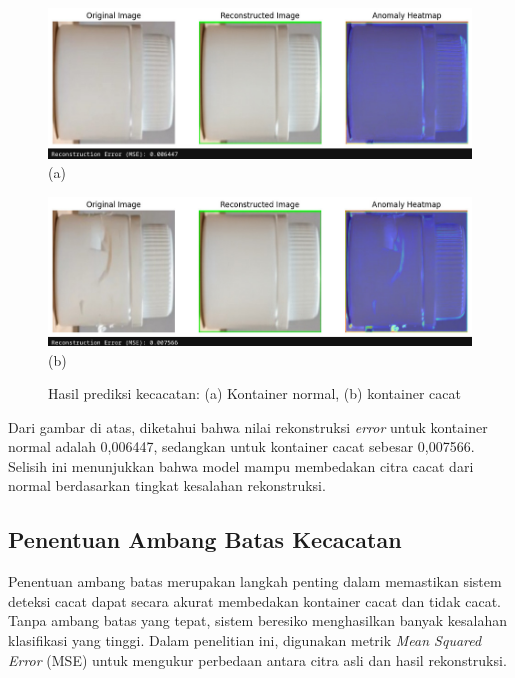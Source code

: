 \begin{figure}[H]
  \centering
  \begin{minipage}{\textwidth}
    \centering
    \includegraphics[width=\textwidth]{gambar/kontainer_bagus.jpeg}
    (a)
  \end{minipage}
  \vspace{1em}

  \begin{minipage}{\textwidth}
    \centering
    \includegraphics[width=\textwidth]{gambar/kontainer_cacat.jpeg}
    (b)
  \end{minipage}
  \caption{Hasil prediksi kecacatan: (a) Kontainer normal, (b)
  kontainer cacat}
  \label{fig:autoencoder-test}
  \vspace{-1em}
\end{figure}

Dari gambar di atas, diketahui bahwa nilai rekonstruksi
\textit{error} untuk kontainer
normal adalah 0,006447, sedangkan untuk kontainer cacat sebesar
0,007566. Selisih ini menunjukkan bahwa model mampu membedakan citra
cacat dari normal berdasarkan tingkat kesalahan rekonstruksi.

\vspace{1em}

\subsection{Penentuan Ambang Batas Kecacatan}
\noindent{}
Penentuan ambang batas merupakan langkah penting dalam memastikan
sistem deteksi cacat dapat secara akurat membedakan kontainer cacat
dan tidak cacat. Tanpa ambang batas yang tepat, sistem beresiko
menghasilkan banyak kesalahan klasifikasi yang tinggi. Dalam
penelitian ini, digunakan metrik \textit{Mean Squared Error} (MSE) untuk
mengukur perbedaan antara citra asli dan hasil rekonstruksi.

